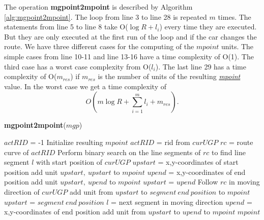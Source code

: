 \documentclass[a4paper]{article}
\newcommand{\op}[1]{\textbf{#1}}
\newcommand{\dt}[1]{\textsl{\underline{#1}}}
\begin{document}
The operation \op{mgpoint2mpoint} is described by Algorithm
\ref{alg:mgpoint2mpoint}. The loop from line 3 to line 28 is repeated $m$ times. The statements from
line 5 to line 8 take O($\log R + l_i$) every time they are executed. But they
are only executed at the first run of the loop and if the car changes the route.
We have three different cases for the computing of the $mpoint$ units. The
simple cases from line 10-11 and line 13-16 have a time complexity of O(1).
The third case has a worst case complexity from O($l_i$). The last line 29 has a time
complexity of O($m_{res}$) if $m_{res}$ is the number of units of the resulting
\dt{mpoint} value. In the worst case we get a time complexity of
\[O(m \log {R} + \sum_{i=1}^{m}{l_i} + m_{res}).\]
\begin{algorithm}[H]
  \caption{\op{mgpoint2mpoint}($mgp$)}
  \label{alg:mgpoint2mpoint}
  \begin{algorithmic}[1]
    \STATE $actRID$ = -1
    \STATE Initialize resulting $mpoint$
        \STATE $actRID$ = rid from $curUGP$
        \STATE $rc$ = route curve of $actRID$
        \STATE Perform binary search on the line segments of $rc$ to find
        line segment $l$ with start position of $curUGP$
        \STATE $upstart$ = x,y-coordinates of start position
      \ENDIF
        \STATE add unit $upstart,\ upstart$ to $mpoint$
      \ELSE
          \STATE $upend$ = x,y-coordinates of end position
          \STATE add unit $upstart,\ upend$ to $mpoint$
          \STATE $upstart$ = $upend$
        \ELSE
          \STATE Follow $rc$ in moving direction of $curUGP$
            \STATE add unit from $upstart$ to $segment\ end\ position$ to
$mpoint$
            \STATE $upstart$ = $segment\ end\ position$
            \STATE $l$ = next segment in moving direction
          \ENDWHILE
          \STATE $upend$ = x,y-coordinates of end position
          \STATE add unit from $upstart$ to $upend$ to $mpoint$
        \ENDIF
      \ENDIF
    \ENDFOR
    \RETURN $mpoint$
  \end{algorithmic}
\end{algorithm}
\end{document}

